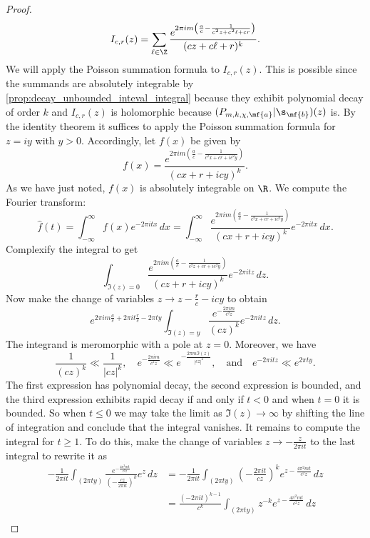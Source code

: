 \begin{proof}
      \[
        I_{c,r}(z) = \sum_{\ell \in \Z}\frac{e^{2\pi im\left(\frac{a}{c}-\frac{1}{c^{2}z+c^{2}\ell+cr}\right)}}{(cz+c\ell+r)^{k}}.
      \]
      We will apply the Poisson summation formula to $I_{c,r}(z)$. This is possible since the summands are absolutely integrable by \cref{prop:decay_unbounded_inteval_integral} because they exhibit polynomial decay of order $k$ and $I_{c,r}(z)$ is holomorphic because $(P_{m,k,\chi,\mf{a}}|\s_{\mf{b}})(z)$ is. By the identity theorem it suffices to apply the Poisson summation formula for $z = iy$ with $y > 0$. Accordingly, let $f(x)$ be given by
      \[
        f(x) = \frac{e^{2\pi im\left(\frac{a}{c}-\frac{1}{c^{2}x+cr+ic^{2}y}\right)}}{(cx+r+icy)^{k}}.
      \]
      As we have just noted, $f(x)$ is absolutely integrable on $\R$. We compute the Fourier transform:
      \[
        \hat{f}(t) = \int_{-\infty}^{\infty}f(x)e^{-2\pi itx}\,dx = \int_{-\infty}^{\infty}\frac{e^{2\pi im\left(\frac{a}{c}-\frac{1}{c^{2}x+cr+ic^{2}y}\right)}}{(cx+r+icy)^{k}}e^{-2\pi itx}\,dx.
      \]
      Complexify the integral to get
      \[
        \int_{\Im(z) = 0}\frac{e^{2\pi im\left(\frac{a}{c}-\frac{1}{c^{2}z+cr+ic^{2}y}\right)}}{(cz+r+icy)^{k}}e^{-2\pi itz}\,dz.
      \]
      Now make the change of variables $z \to z-\frac{r}{c}-icy$ to obtain
      \[
        e^{2\pi im\frac{a}{c}+2\pi it\frac{r}{c}-2\pi ty}\int_{\Im(z) = y}\frac{e^{-\frac{2\pi im}{c^{2}z}}}{(cz)^{k}}e^{-2\pi itz}\,dz.
      \]
      The integrand is meromorphic with a pole at $z = 0$. Moreover, we have
      \[
        \frac{1}{(cz)^{k}} \ll \frac{1}{|cz|^{k}}, \quad e^{-\frac{2\pi im}{c^{2}z}} \ll e^{-\frac{2\pi m\Im(z)}{|cz|^{2}}}, \quad \text{and} \quad e^{-2\pi itz} \ll e^{2\pi ty}.
      \]
      The first expression has polynomial decay, the second expression is bounded, and the third expression exhibits rapid decay if and only if $t < 0$ and when $t = 0$ it is bounded. So when $t \le 0$ we may take the limit as $\Im(z) \to \infty$ by shifting the line of integration and conclude that the integral vanishes. It remains to compute the integral for $t \ge 1$. To do this, make the change of variables $z \to -\frac{z}{2\pi it}$ to the last integral to rewrite it as
      \begin{align*}
        -\frac{1}{2\pi it}\int_{(2\pi ty)}\frac{e^{-\frac{4\pi^{2}mt}{c^{2}z}}}{\left(-\frac{cz}{2\pi it}\right)^{k}}e^{z}\,dz &= -\frac{1}{2\pi it}\int_{(2\pi ty)}\left(-\frac{2\pi it}{cz}\right)^{k}e^{z-\frac{4\pi^{2}mt}{c^{2}z}}\,dz \\
        &= \frac{(-2\pi it)^{k-1}}{c^{k}}\int_{(2\pi ty)}z^{-k}e^{z-\frac{4\pi^{2}mt}{c^{2}z}}\,dz \\

\end{align*}
\end{proof}
